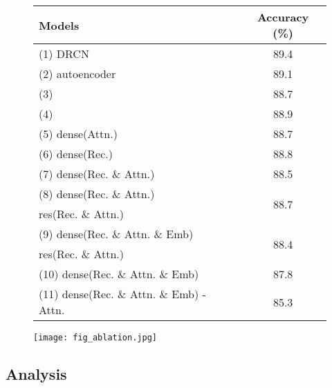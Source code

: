 \documentclass[letterpaper]{article} \usepackage{aaai19}  \usepackage{times}  \usepackage{helvet}  \usepackage{courier}  \usepackage{url}  \usepackage{graphicx}  \frenchspacing  \setlength{\pdfpagewidth}{8.5in}  \setlength{\pdfpageheight}{11in}
\begin{document}
\begin{figure}[!t]
\centering
\resizebox{\linewidth}{!}
{\begin{tabular}{lc}\hline
Models							 & \textbf{Accuracy (\%)} \\
	\hline
	\hline
    (1) \hspace{1mm} DRCN & 89.4 \\
	\hline   
    (2) \hspace{2mm}  autoencoder & 89.1 \\
	\hline
    (3) \hspace{2mm}   & 88.7 \\
    (4) \hspace{2mm}   & 88.9 \\
	\hline
    (5) \hspace{2mm}  dense(Attn.) & 88.7 \\
    (6) \hspace{2mm}  dense(Rec.) & 88.8 \\
    (7) \hspace{2mm}  dense(Rec. \& Attn.)  & 88.5 \\
    (8) \hspace{2mm}  dense(Rec. \& Attn.)  & 
    \multirow{2}{*}{88.7} \\
        \hspace{6.3mm}  res(Rec. \& Attn.) &  \\
    (9) \hspace{2mm}  dense(Rec. \& Attn. \& Emb)  & 
	\multirow{2}{*}{88.4} \\
        \hspace{6.3mm}  res(Rec. \& Attn.) &   \\
	\hline
    (10) \hspace{2mm}  dense(Rec. \& Attn. \& Emb) & 87.8 \\
    (11) \hspace{2mm}  dense(Rec. \& Attn. \& Emb) - Attn. & 85.3 \\
  	\hline
\end{tabular}}
\label{tab:exp_abl}
\hfill
  \texttt{[image: fig\_ablation.jpg]}
  \label{fig:graph}

\end{figure} 

\subsection{Analysis}
\end{document}
